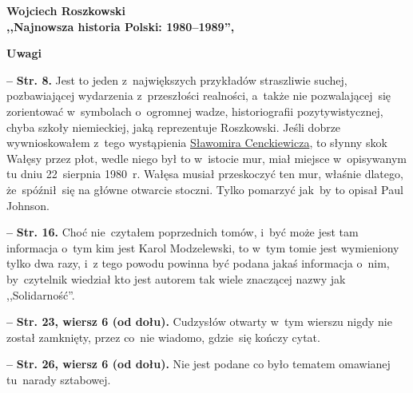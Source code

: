 \documentclass[a4paper,11pt]{article}
\newcommand{\spaceTwo}{2em}
\newcommand{\spaceFour}{0.5em}
\newcommand{\tb}{\textbf}
\newcommand{\noi}{\noindent}
\newcommand{\start}{\noi \tb{--} {}}
\newcommand{\Center}[1]{\begin{center} #1 \end{center}}
\newcommand{\CenterTB}[1]{\Center{\tb{#1}}}
\newcommand{\Str}[1]{\tb{Str. #1.}}
\newcommand{\StrWd}[2]{\tb{Str. #1, wiersz #2 (od dołu).}}
\newcommand{\Work}[1]{ \begin{center} {\large \tb{#1}} \end{center} }
\begin{document}
\vspace{\spaceTwo}





\Work{
  Wojciech Roszkowski \\
  ,,Najnowsza historia Polski: 1980--1989'',
  \cite{RoszkowskiNajnowszaHistoriaPolski80-89Wyd11} }


\CenterTB{Uwagi}

\start \Str{8} Jest to jeden z~największych przykładów straszliwie
suchej, pozbawiającej wydarzenia z~przeszłości realności, a~także nie
pozwalającej~się zorientować w~symbolach o~ogromnej wadze,
historiografii pozytywistycznej, chyba szkoły niemieckiej, jaką
reprezentuje Roszkowski. Jeśli dobrze wywnioskowałem z~tego
wystąpienia
\href{https://www.youtube.com/watch?v=6B93_3CCMac}{Sławomira
  Cenckiewicza}, to słynny skok Wałęsy przez płot, wedle niego był to
w~istocie mur, miał miejsce w~opisywanym tu dniu 22~sierpnia 1980~r.
Wałęsa musiał przeskoczyć ten mur, właśnie dlatego, że~spóźnił~się na
główne otwarcie stoczni. Tylko pomarzyć jak~by to opisał Paul Johnson.

\vspace{\spaceFour}


\start \Str{16} Choć nie~czytałem poprzednich tomów, i~być może jest
tam informacja o~tym kim jest Karol Modzelewski, to w~tym tomie jest
wymieniony tylko dwa razy, i~z tego powodu powinna być podana jakaś
informacja o~nim, by~czytelnik wiedział kto jest autorem tak wiele
znaczącej nazwy jak ,,Solidarność''.

\vspace{\spaceFour}


\start \StrWd{23}{6} Cudzysłów otwarty w~tym wierszu nigdy nie został
zamknięty, przez co~nie wiadomo, gdzie~się kończy cytat.

\vspace{\spaceFour}


\start \StrWd{26}{6} Nie jest podane co było tematem omawianej
tu~narady sztabowej.


\end{document}
